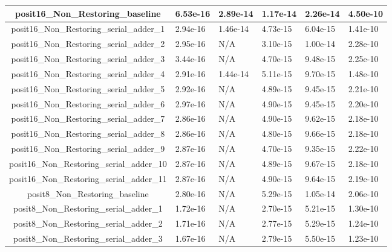 \begin{tabularx}{\linewidth}{|c|X|X|X|X|X|}
posit16\_Non\_Restoring\_baseline & 6.53e-16 & 2.89e-14 & 1.17e-14 & 2.26e-14 & 4.50e-10\\ \hline
posit16\_Non\_Restoring\_serial\_adder\_1 & 2.94e-16 & 1.46e-14 & 4.73e-15 & 6.04e-15 & 1.41e-10\\ \hline
posit16\_Non\_Restoring\_serial\_adder\_2 & 2.95e-16 & N/A & 3.10e-15 & 1.00e-14 & 2.28e-10\\ \hline
posit16\_Non\_Restoring\_serial\_adder\_3 & 3.44e-16 & N/A & 4.70e-15 & 9.48e-15 & 2.25e-10\\ \hline
posit16\_Non\_Restoring\_serial\_adder\_4 & 2.91e-16 & 1.44e-14 & 5.11e-15 & 9.70e-15 & 1.48e-10\\ \hline
posit16\_Non\_Restoring\_serial\_adder\_5 & 2.92e-16 & N/A & 4.89e-15 & 9.45e-15 & 2.21e-10\\ \hline
posit16\_Non\_Restoring\_serial\_adder\_6 & 2.97e-16 & N/A & 4.90e-15 & 9.45e-15 & 2.20e-10\\ \hline
posit16\_Non\_Restoring\_serial\_adder\_7 & 2.86e-16 & N/A & 4.90e-15 & 9.62e-15 & 2.18e-10\\ \hline
posit16\_Non\_Restoring\_serial\_adder\_8 & 2.86e-16 & N/A & 4.80e-15 & 9.66e-15 & 2.18e-10\\ \hline
posit16\_Non\_Restoring\_serial\_adder\_9 & 2.87e-16 & N/A & 4.70e-15 & 9.35e-15 & 2.22e-10\\ \hline
posit16\_Non\_Restoring\_serial\_adder\_10 & 2.87e-16 & N/A & 4.89e-15 & 9.67e-15 & 2.18e-10\\ \hline
posit16\_Non\_Restoring\_serial\_adder\_11 & 2.87e-16 & N/A & 4.90e-15 & 9.64e-15 & 2.19e-10\\ \hline
posit8\_Non\_Restoring\_baseline & 2.80e-16 & N/A & 5.29e-15 & 1.05e-14 & 2.06e-10\\ \hline
posit8\_Non\_Restoring\_serial\_adder\_1 & 1.72e-16 & N/A & 2.70e-15 & 5.21e-15 & 1.30e-10\\ \hline
posit8\_Non\_Restoring\_serial\_adder\_2 & 1.71e-16 & N/A & 2.77e-15 & 5.29e-15 & 1.24e-10\\ \hline
posit8\_Non\_Restoring\_serial\_adder\_3 & 1.67e-16 & N/A & 2.79e-15 & 5.50e-15 & 1.23e-10\\ \hline
\end{tabularx}

